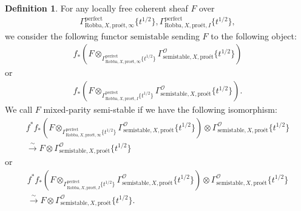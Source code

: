\documentclass[12pt]{book}
\theoremstyle{definition}
\newtheorem{definition}{Definition}
\begin{document}
\begin{definition}
For any locally free coherent sheaf $F$ over
\begin{align}
\Gamma^\mathrm{perfect}_{\text{Robba},X,\text{pro\'et},\infty}\{t^{1/2}\},\Gamma^\mathrm{perfect}_{\text{Robba},X,\text{pro\'et},I}\{t^{1/2}\},
\end{align} 
we consider the following functor $\mathrm{semistable}$ sending $F$ to the following object:
\begin{align}
f_*(F\otimes_{\Gamma^\mathrm{perfect}_{\text{Robba},X,\text{pro\'et},\infty}\{t^{1/2}\}} \Gamma^\mathcal{O}_{\text{semistable},X,\text{pro\'et}}\{t^{1/2}\})
\end{align}
or 
\begin{align}
f_*(F\otimes_{\Gamma^\mathrm{perfect}_{\text{Robba},X,\text{pro\'et},I}\{t^{1/2}\}} \Gamma^\mathcal{O}_{\text{semistable},X,\text{pro\'et}}\{t^{1/2}\}).
\end{align}
We call $F$ mixed-parity semi-stable if we have the following isomorphism:
\begin{align}
f^*f_*(F\otimes_{\Gamma^\mathrm{perfect}_{\text{Robba},X,\text{pro\'et},\infty}\{t^{1/2}\}} \Gamma^\mathcal{O}_{\text{semistable},X,\text{pro\'et}}\{t^{1/2}\}) \otimes \Gamma^\mathcal{O}_{\text{semistable},X,\text{pro\'et}}\{t^{1/2}\}\\
 \overset{\sim}{\longrightarrow} F \otimes \Gamma^\mathcal{O}_{\text{semistable},X,\text{pro\'et}}\{t^{1/2}\} 
\end{align}
or 
\begin{align}
f^*f_*(F\otimes_{\Gamma^\mathrm{perfect}_{\text{Robba},X,\text{pro\'et},I}\{t^{1/2}\}} \Gamma^\mathcal{O}_{\text{semistable},X,\text{pro\'et}}\{t^{1/2}\}) \otimes \Gamma^\mathcal{O}_{\text{semistable},X,\text{pro\'et}}\{t^{1/2}\} \\\overset{\sim}{\longrightarrow} F \otimes \Gamma^\mathcal{O}_{\text{semistable},X,\text{pro\'et}}\{t^{1/2}\}. 
\end{align}
\end{definition}
\end{document}
